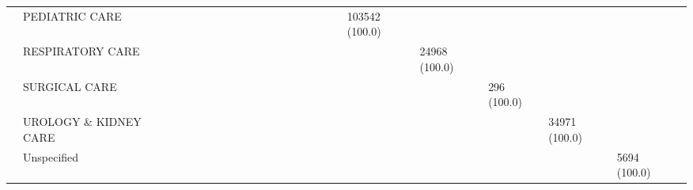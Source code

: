 \begin{tabular}{llllllllllllllllllllllll}
                                       & PEDIATRIC CARE &                             &                   &                    &                   &                      &                        &                     &                     &                     &                     &                    &                             &                   &                      &                                  &                    &     103542 (100.0) &                    &                   &                       &                     &                    \\
                                       & RESPIRATORY CARE &                             &                   &                    &                   &                      &                        &                     &                     &                     &                     &                    &                             &                   &                      &                                  &                    &                    &      24968 (100.0) &                   &                       &                     &                    \\
                                       & SURGICAL CARE &                             &                   &                    &                   &                      &                        &                     &                     &                     &                     &                    &                             &                   &                      &                                  &                    &                    &                    &       296 (100.0) &                       &                     &                    \\
                                       & UROLOGY \& KIDNEY CARE &                             &                   &                    &                   &                      &                        &                     &                     &                     &                     &                    &                             &                   &                      &                                  &                    &                    &                    &                   &         34971 (100.0) &                     &                    \\
                                       & Unspecified &                             &                   &                    &                   &                      &                        &                     &                     &                     &                     &                    &                             &                   &                      &                                  &                    &                    &                    &                   &                       &        5694 (100.0) &                    \\

\end{tabular}
